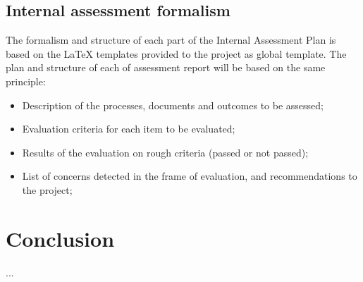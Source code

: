 \documentclass{template/openetcs_article}
\begin{document}
\subsection{Internal assessment formalism}
The formalism and structure of each part of the Internal Assessment Plan is based on the LaTeX templates provided to the project as global template.
The plan and structure of each of assessment report will be based on the same principle:
 \begin{itemize}
\item Description of the processes, documents and outcomes to be assessed;
\item Evaluation criteria for each item to be evaluated;
\item Results of the evaluation on rough criteria (passed or not passed);
\item List of concerns detected in the frame of evaluation, and recommendations to the project;
\end{itemize}

\section{Conclusion}
...







\end{document}
